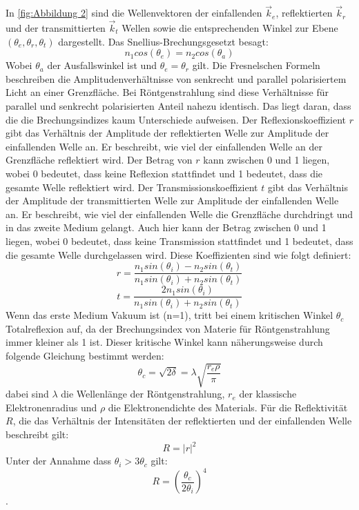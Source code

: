 In \ref{fig:Abbildung 2} sind die Wellenvektoren der einfallenden $\vec{k}_e$, reflektierten $\vec{k}_r$ und der
transmittierten $\vec{k}_t$ Wellen sowie die entsprechenden Winkel zur Ebene $(\theta_e,\theta_r,\theta_t)$ dargestellt.
Das Snellius-Brechungsgesetzt besagt:
\begin{equation}
    n_1cos(\theta_e)=n_2cos(\theta_a)
\end{equation}
Wobei $\theta_a$ der Ausfallswinkel ist und $\theta_e=\theta_r$ gilt.    
Die Fresnelschen Formeln beschreiben die Amplitudenverhältnisse von senkrecht und parallel polarisiertem Licht
an einer Grenzfläche. Bei Röntgenstrahlung sind diese Verhältnisse für parallel und senkrecht polarisierten Anteil nahezu 
identisch. Das liegt daran, dass die die Brechungsindizes kaum Unterschiede aufweisen. 
Der Reflexionskoeffizient \(r\) gibt das Verhältnis der Amplitude der reflektierten Welle zur Amplitude der einfallenden Welle an. 
Er beschreibt, wie viel der einfallenden Welle an der Grenzfläche reflektiert wird. Der Betrag von \(r\) kann zwischen 0 und 1
liegen, wobei 0 bedeutet, dass keine Reflexion stattfindet und 1 bedeutet, dass die gesamte Welle reflektiert wird.
Der Transmissionskoeffizient \(t\) gibt das Verhältnis der Amplitude der transmittierten Welle zur Amplitude der einfallenden Welle an.
Er beschreibt, wie viel der einfallenden Welle die Grenzfläche durchdringt und in das zweite Medium gelangt. Auch hier kann der Betrag 
zwischen 0 und 1 liegen, wobei 0 bedeutet, dass keine Transmission stattfindet und 1 bedeutet, dass die gesamte Welle durchgelassen wird.
Diese Koeffizienten sind wie folgt definiert:
\begin{equation}
    r=\frac{n_1sin(\theta_i)-n_2sin(\theta_t)}{n_1sin(\theta_i)+n_2sin(\theta_t)}
\end{equation}
\begin{equation}
    t=\frac{2n_1sin(\theta_i)}{n_1sin(\theta_i)+n_2sin(\theta_t)} 
\end{equation}
Wenn das erste Medium Vakuum ist (n=1), tritt bei einem kritischen Winkel $\theta_c$ Totalreflexion auf, da der Brechungsindex von Materie für
Röntgenstrahlung immer kleiner als 1 ist. Dieser kritische Winkel kann näherungsweise durch folgende Gleichung bestimmt werden:
\begin{equation}
    \theta_c = \sqrt{2\delta} = \lambda \sqrt{\frac{r_e \rho}{\pi}}
\end{equation}    
dabei sind $\lambda$ die Wellenlänge der Röntgenstrahlung, \(r_e\) der klassische Elektronenradius und $\rho$ die Elektronendichte des Materials.
Für die Reflektivität \(R\), die das Verhältnis der Intensitäten der reflektierten und der einfallenden Welle beschreibt gilt:
\begin{equation}
    R=|r|^2
\end{equation}
Unter der Annahme dass $\theta_i>3\theta_c$ gilt:
\begin{equation}
    R=(\frac{\theta_c}{2\theta_i})^4
\end{equation} 
\cite{Röntgenstrahlung}.

